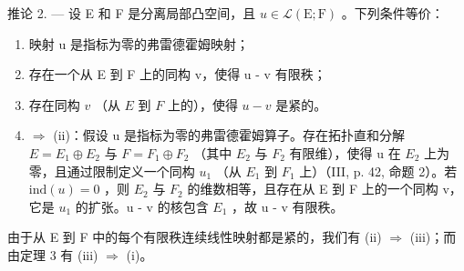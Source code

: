 推论 2. --- 设 E 和 F 是分离局部凸空间，且 \(u \in \mathcal{L}(\mathrm{E};\mathrm{F})\) 。下列条件等价：

\begin{enumerate}
\def\labelenumi{(\roman{enumi})}
\item
  映射 u 是指标为零的弗雷德霍姆映射；
\item
  存在一个从 E 到 F 上的同构 v，使得 u - v 有限秩；
\item
  存在同构 \(v\) （从 \(E\) 到 \(F\) 上的），使得 \(u - v\) 是紧的。
\item
  \(\Longrightarrow\) (ii)：假设 u 是指标为零的弗雷德霍姆算子。存在拓扑直和分解 \(E = E_{1} \oplus E_{2}\) 与 \(F = F_{1} \oplus F_{2}\) （其中 \(E_{2}\) 与 \(F_{2}\) 有限维），使得 u 在 \(E_{2}\) 上为零，且通过限制定义一个同构 \(u_{1}\) （从 \(E_{1}\) 到 \(F_{1}\) 上）（III, p. 42, 命题 2）。若 \(\text{ind}(u) = 0\) ，则 \(E_{2}\) 与 \(F_{2}\) 的维数相等，且存在从 E 到 F 上的一个同构 v，它是 \(u_{1}\) 的扩张。u - v 的核包含 \(E_{1}\) ，故 u - v 有限秩。
\end{enumerate}

由于从 E 到 F 中的每个有限秩连续线性映射都是紧的，我们有 (ii) \(\Longrightarrow\) (iii)；而由定理 3 有 (iii) \(\Longrightarrow\) (i)。

